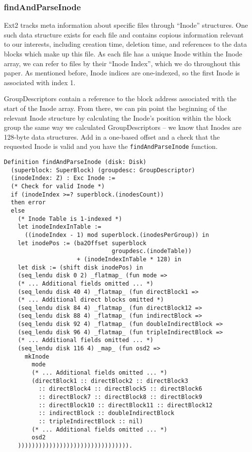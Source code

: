 \documentclass[nocopyrightspace]{sigplanconf}
\begin{document}
\subsubsection{findAndParseInode}

Ext2 tracks meta information about specific files through ``Inode''
structures. One such data structure exists for each file and contains copious
information relevant to our interests, including creation time, deletion time,
and references to the data blocks which make up this file. As each file has a
unique Inode within the Inode array, we can refer to files by their ``Inode
Index'', which we do throughout this paper. As mentioned before, Inode indices
are one-indexed, so the first Inode is associated with index 1.

GroupDescriptors contain a reference to the block address associated with the
start of the Inode array. From there, we can pin point the beginning of the
relevant Inode structure by calculating the Inode's position within the block
group the same way we calculated GroupDescriptors -- we know that Inodes are
128-byte data structures.  Add in a one-based offset and a check that the
requested Inode is valid and you have the {\tt findAndParseInode} function.

\begin{lstlisting}
Definition findAndParseInode (disk: Disk) 
  (superblock: SuperBlock) (groupdesc: GroupDescriptor)
  (inodeIndex: Z) : Exc Inode :=
  (* Check for valid Inode *)
  if (inodeIndex >=? superblock.(inodesCount))
  then error
  else
    (* Inode Table is 1-indexed *)
    let inodeIndexInTable := 
      ((inodeIndex - 1) mod superblock.(inodesPerGroup)) in
    let inodePos := (ba2Offset superblock
                               groupdesc.(inodeTable))
                     + (inodeIndexInTable * 128) in
    let disk := (shift disk inodePos) in
    (seq_lendu disk 0 2) _flatmap_ (fun mode =>
    (* ... Additional fields omitted ... *)
    (seq_lendu disk 40 4) _flatmap_ (fun directBlock1 =>
    (* ... Additional direct blocks omitted *)
    (seq_lendu disk 84 4) _flatmap_ (fun directBlock12 =>
    (seq_lendu disk 88 4) _flatmap_ (fun indirectBlock =>
    (seq_lendu disk 92 4) _flatmap_ (fun doubleIndirectBlock =>
    (seq_lendu disk 96 4) _flatmap_ (fun tripleIndirectBlock =>
    (* ... Additional fields omitted ... *)
    (seq_lendu disk 116 4) _map_ (fun osd2 =>
      mkInode
        mode
        (* ... Additional fields omitted ... *)
        (directBlock1 :: directBlock2 :: directBlock3
          :: directBlock4 :: directBlock5 :: directBlock6
          :: directBlock7 :: directBlock8 :: directBlock9
          :: directBlock10 :: directBlock11 :: directBlock12
          :: indirectBlock :: doubleIndirectBlock
          :: tripleIndirectBlock :: nil)
        (* ... Additional fields omitted ... *)
        osd2
    )))))))))))))))))))))))))))))))).
\end{lstlisting}
\end{document}
